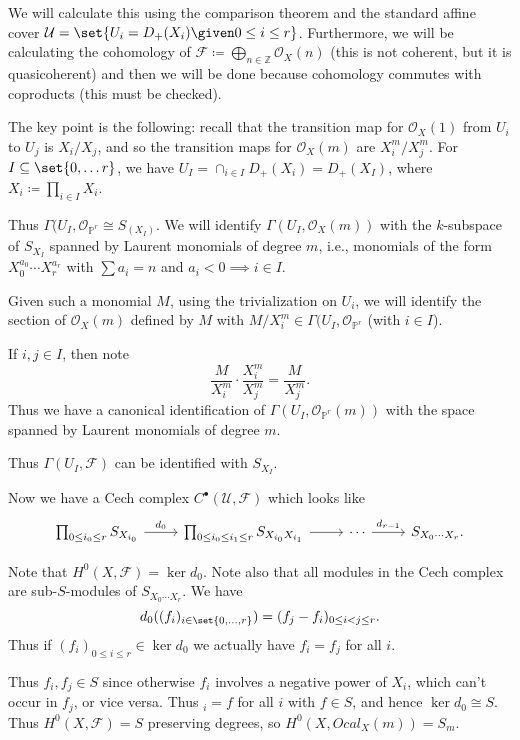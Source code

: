We will calculate this using the comparison theorem and the standard affine
cover $\mathcal{U} = \set{U_i = D_+(X_i)\given 0\leq i\leq r}$. Furthermore,
we will be calculating the cohomology of $\mathcal{F}\coloneqq \bigoplus_{n \in \mathbb{Z}} \mathcal{O}_X(n)$
(this is not coherent, but it is quasicoherent)
and then we will be done because cohomology commutes with coproducts (this must
be checked).

The key point is the following: recall that the transition map for $\mathcal{O}_X(1)$
from $U_i$ to $U_j$ is $X_i/X_j$, and so the transition maps for $\mathcal{O}_X(m)$
are $X_i^m/X_j^m$. For $I \subseteq \set{0, \ldots r}$, we have $U_I = \cap_{i \in I} D_+(X_i) = D_+(X_I)$,
where $X_i\coloneqq \prod_{i \in I} X_i$.

Thus $\Gamma(U_I, \mathcal{O}_{\mathbb{P}^r}\cong S_{(X_I)}$. We will identify
$\Gamma(U_I, \mathcal{O}_X(m))$ with the $k$-subspace of $S_{X_I}$ spanned by
Laurent monomials of degree $m$, i.e., monomials of the form
$X_0^{a_0}\cdots X_r^{a_r}$ with $\sum a_i = n$ and $a_i < 0\implies i \in I$.

Given such a monomial $M$, using the trivialization on $U_i$, we will
identify the section of $\mathcal{O}_X(m)$ defined by $M$ with
$M/X_i^m \in \Gamma(U_I, \mathcal{O}_{\mathbb{P}^r}$ (with $i \in I$).

If $i, j \in I$, then note
\[ \frac{M}{X_i^m}\cdot \frac{X_i^m}{X_j^m} = \frac{M}{X_j^m}. \]
Thus we have a canonical identification of $\Gamma(U_I, \mathcal{O}_{\mathbb{P}^r}(m))$
with the space spanned by Laurent monomials of degree $m$.

Thus $\Gamma(U_I, \mathcal{F})$ can be identified with $S_{X_I}$.

Now we have a Cech complex $C^\bullet(\mathcal{U}, \mathcal{F})$ which looks like
\[\begin{tikzcd}
	\prod_{0\leq i_0\leq r}S_{X_{i_0}} \ar[r, "d_0"] & \prod_{0\leq i_0\leq i_1\leq r} S_{X_{i_0}X_{i_1}}\ar[r] & \cdots\ar[r, "d_{r-1}"] & S_{X_0\cdots X_r}.
\end{tikzcd}\]

Note that $H^0(X, \mathcal{F}) = \ker d_0$. Note also that all modules in the Cech
complex are sub-$S$-modules of $S_{X_0\cdots X_r}$.
We have
\[ d_0((f_i)_{i \in\set{0, \ldots, r}}) = (f_j - f_i)_{0\leq i<j\leq r}. \]
Thus if $(f_i)_{0\leq i\leq r} \in \ker d_0$ we actually have $f_i = f_j$ for all $i$.

Thus $f_i, f_j \in S$ since otherwise $f_i$ involves a negative power of
$X_i$, which can't occur in $f_j$, or vice versa. Thus $_i = f$ for all $i$
with $f \in S$, and hence $\ker d_0\cong S$. Thus $H^0(X, \mathcal{F}) = S$
preserving degrees, so $H^0(X, Ocal_X(m)) = S_m$.

